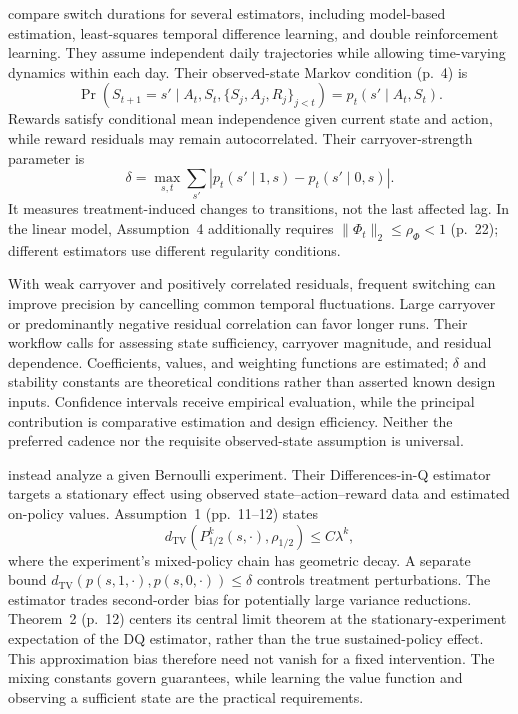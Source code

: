 \documentclass[12pt]{article}
\begin{document}
\citet{wen2025} compare switch durations for several estimators, including model-based estimation, least-squares temporal difference learning, and double reinforcement learning. They assume independent daily trajectories while allowing time-varying dynamics within each day. Their observed-state Markov condition (p.~4) is
\begin{equation}
 \Pr(S_{t+1}=s'\mid A_t,S_t,\{S_j,A_j,R_j\}_{j<t})
 =p_t(s'\mid A_t,S_t).
\end{equation}
Rewards satisfy conditional mean independence given current state and action, while reward residuals may remain autocorrelated. Their carryover-strength parameter is
\begin{equation}
 \delta=\max_{s,t}\sum_{s'}
 |p_t(s'\mid1,s)-p_t(s'\mid0,s)|.
\end{equation}
It measures treatment-induced changes to transitions, not the last affected lag. In the linear model, Assumption~4 additionally requires $\lVert\Phi_t\rVert_2\leq\rho_\Phi<1$ (p.~22); different estimators use different regularity conditions.

With weak carryover and positively correlated residuals, frequent switching can improve precision by cancelling common temporal fluctuations. Large carryover or predominantly negative residual correlation can favor longer runs. Their workflow calls for assessing state sufficiency, carryover magnitude, and residual dependence. Coefficients, values, and weighting functions are estimated; $\delta$ and stability constants are theoretical conditions rather than asserted known design inputs. Confidence intervals receive empirical evaluation, while the principal contribution is comparative estimation and design efficiency. Neither the preferred cadence nor the requisite observed-state assumption is universal.

\citet{farias2022} instead analyze a given Bernoulli experiment. Their Differences-in-Q estimator targets a stationary effect using observed state--action--reward data and estimated on-policy values. Assumption~1 (pp.~11--12) states
\begin{equation}
 d_{\mathrm{TV}}(P_{1/2}^{k}(s,\cdot),\rho_{1/2})
 \leq C\lambda^k,
\end{equation}
where the experiment's mixed-policy chain has geometric decay. A separate bound $d_{\mathrm{TV}}(p(s,1,\cdot),p(s,0,\cdot))\leq\delta$ controls treatment perturbations. The estimator trades second-order bias for potentially large variance reductions. Theorem~2 (p.~12) centers its central limit theorem at the stationary-experiment expectation of the DQ estimator, rather than the true sustained-policy effect. This approximation bias therefore need not vanish for a fixed intervention. The mixing constants govern guarantees, while learning the value function and observing a sufficient state are the practical requirements.
\end{document}

